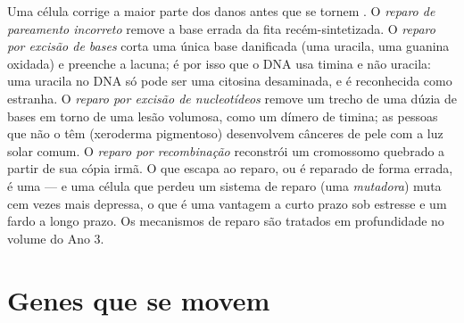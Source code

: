 \begin{proposition}\label{prop:b2:genome-diversification:repair}
Uma célula corrige a maior parte dos danos antes que se tornem
. O \emph{reparo de pareamento incorreto} remove a base errada
da fita recém-sintetizada. O \emph{reparo por excisão de bases} corta
uma única base danificada (uma uracila, uma guanina oxidada) e
preenche a lacuna; é por isso que o DNA usa timina e não uracila: uma
uracila no DNA só pode ser uma citosina desaminada, e é reconhecida
como estranha. O \emph{reparo por excisão de nucleotídeos} remove um
trecho de uma dúzia de bases em torno de uma lesão volumosa, como um
dímero de timina; as pessoas que não o têm (xeroderma pigmentoso)
desenvolvem cânceres de pele com a luz solar comum. O \emph{reparo por
recombinação} reconstrói um cromossomo quebrado a partir de sua cópia
irmã. O que escapa ao reparo, ou é reparado de forma errada, é uma
 --- e uma célula que perdeu um sistema de reparo (uma
\emph{mutadora}) muta cem vezes mais depressa, o que é uma vantagem a
curto prazo sob estresse e um fardo a longo prazo. Os mecanismos de
reparo são tratados em profundidade no volume do Ano 3.
\end{proposition}

\section{Genes que se movem}

